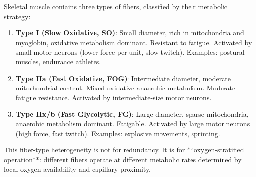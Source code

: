 \begin{definition}
\label{def:fiber-types}
Skeletal muscle contains three types of fibers, classified by their metabolic strategy:

\begin{enumerate}[label=(\Roman*), noitemsep]
\item \textbf{Type I (Slow Oxidative, SO)}: Small diameter, rich in mitochondria and myoglobin, oxidative metabolism dominant. Resistant to fatigue. Activated by small motor neurons (lower force per unit, slow twitch). Examples: postural muscles, endurance athletes.

\item \textbf{Type IIa (Fast Oxidative, FOG)}: Intermediate diameter, moderate mitochondrial content. Mixed oxidative-anaerobic metabolism. Moderate fatigue resistance. Activated by intermediate-size motor neurons.

\item \textbf{Type IIx/b (Fast Glycolytic, FG)}: Large diameter, sparse mitochondria, anaerobic metabolism dominant. Fatigable. Activated by large motor neurons (high force, fast twitch). Examples: explosive movements, sprinting.
\end{enumerate}

This fiber-type heterogeneity is not for redundancy. It is for **oxygen-stratified operation**: different fibers operate at different metabolic rates determined by local oxygen availability and capillary proximity.
\end{definition}

